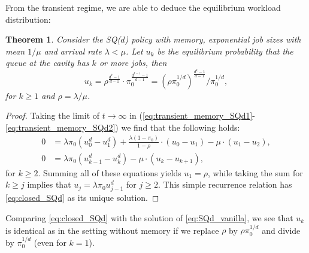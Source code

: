 \documentclass[12pt]{report}
\newtheorem{theorem}{Theorem}
\begin{document}
From the transient regime, we are able to deduce the equilibrium workload distribution:
\begin{theorem}\label{thm:closed_SQd}
Consider the SQ($d$) policy with memory, exponential job sizes with mean $1/\mu$ and
arrival rate $\lambda < \mu$.
Let $u_k$ be the equilibrium probability that the queue at the cavity has $k$ or more jobs, then
\begin{equation}
u_k = \rho^{\frac{d^{k} - 1}{d-1}} \cdot \pi_0^{\frac{d^{k-1}-1}{d-1}}
= (\rho \pi_0^{1/d})^{\frac{d^{k} - 1}{d-1}}/\pi_0^{1/d},\label{eq:closed_SQd}
\end{equation}
for $k \geq 1$ and $\rho=\lambda/\mu$.
\end{theorem}
\begin{proof}
Taking the limit of $t\rightarrow \infty$ in (\ref{eq:transient_memory_SQd1}-\ref{eq:transient_memory_SQd2}) we find that the following holds:
\begin{align*}
0 &= \lambda \pi_0 (u_0^d - u_1^d)+ \frac{\lambda (1-\pi_0)}{1-\rho} \cdot (u_0-u_1)-\mu \cdot (u_1 - u_2),\\
0 &= \lambda \pi_0 ( u_{k-1}^d - u_{k}^d ) - \mu \cdot (u_{k} - u_{k+1}),
\end{align*}
for $k \geq 2$. Summing all of these equations yields $u_1 = \rho$, while
taking the sum for $k\geq j$ implies that $u_j = \lambda \pi_0 u_{j-1}^d$ for
$j \geq 2$. This simple recurrence relation has \eqref{eq:closed_SQd} as its unique solution.
\end{proof}
Comparing \eqref{eq:closed_SQd} with the solution of \eqref{eq:SQd_vanilla}, we see that $u_k$
is identical as in the setting without memory if we replace $\rho$ by $\rho \pi_0^{1/d}$ and
divide by $\pi_0^{1/d}$ (even for $k = 1$).
\end{document}
